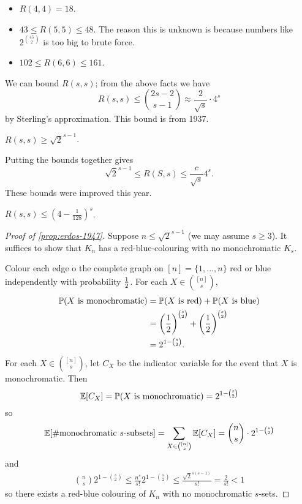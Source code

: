 \documentclass[main.tex]{subfiles}
\begin{document}
\begin{fact*}
  \listhack
  \begin{itemize}
    \item $R(4,4) = 18$.
    \item $43\leq R(5,5)\leq 48$.
      The reason this is unknown is because numbers like $2^{\binom{45}{2}}$
      is too big to brute force.
    \item $102\leq R(6,6)\leq 161$.
  \end{itemize}
\end{fact*}
We can bound $R(s,s)$; from the above facts we have
\[
  R(s,s)\leq\binom{2s-2}{s-1}\approx\frac{2}{\sqrt s}\cdot 4^s
\]
by Sterling's approximation.
This bound is from 1937.
\begin{proposition}[Erd\H{o}s 1947]
  \th\label{prop:erdos-1947}
  $R(s,s)\geq\sqrt{2}^{s-1}$.
\end{proposition}
Putting the bounds together gives
\[
  \sqrt{2}^{s-1}\leq R(S,s)\leq\frac{c}{\sqrt s}4^s.
\]
These bounds were improved this year.
\begin{theorem}
  $R(s,s)\leq\left(4 - \frac{1}{128}\right)^s$.
\end{theorem}

\begin{proof}[Proof of \th\ref{prop:erdos-1947}]%
  Suppose $n\leq\sqrt{2}^{s-1}$ (we may assume $s\geq 3$).
  It suffices to show that $K_n$ has a red-blue-colouring with no monochromatic $K_s$.

  Colour each edge o the complete graph on $[n] = \{1,\ldots,n\}$ red or blue
  independently with probability $\frac{1}{2}$.
  For each $X\in\binom{[n]}{s}$,
  \begin{align*}
    \mathbb P(X\text{ is monochromatic})
    &= \mathbb P(X\text{ is red}) + \mathbb P(X\text{ is blue}) \\
    &= \left(\frac{1}{2}\right)^{\binom s 2} + \left(\frac{1}{2}\right)^{\binom s 2} \\
    &= 2^{1 - \binom s 2}.
  \end{align*}
  For each $X\in\binom{[n]}{s}$, let $C_X$ be the indicator variable for the
  event that $X$ is monochromatic.
  Then
  \[
    \mathbb E[C_X] = \mathbb P(X\text{ is monochromatic}) = 2^{1-\binom s 2}
  \]
  so
  \begin{align*}
    \mathbb E[\#\text{monochromatic $s$-subsets}] = \sum_{X\in\binom{[n]}{s}}\mathbb E[C_X]
    = \binom{n}{s}\cdot2^{1-\binom{s}{2}}
  \end{align*}
  and
  \begin{align*}
  \binom{n}{s}2^{1-\binom s 2}\leq\frac{n^s}{s!}2^{1-\binom s 2}
  \leq\frac{\sqrt{2}^{s(s-1)}}{s!} = \frac{2}{s!} < 1
  \end{align*}
  so there exists a red-blue colouring of $K_n$ with no monochromatic $s$-sets.
\end{proof}
\end{document}
